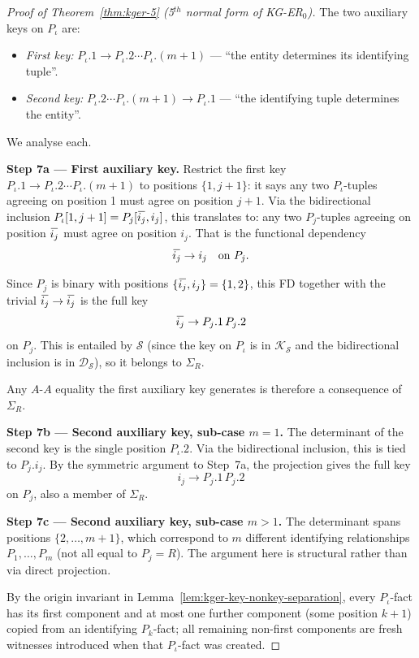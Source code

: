\documentclass[10pt]{article}
\newcommand{\ols}[1]{\mskip.5\thinmuskip\overline{\mskip-.5\thinmuskip {#1} \mskip-.5\thinmuskip}\mskip.5\thinmuskip} %
\begin{document}
\begin{proof}[Proof of Theorem~\ref{thm:kger-5} (5$^{th}$ normal form of KG-ER$_0$)]
The two auxiliary keys on \(P_\iota\) are:
\begin{itemize}
\item \emph{First key:} \(P_\iota.1\to P_\iota.2\cdots P_\iota.(m+1)\)
--- ``the entity determines its identifying tuple''.
\item \emph{Second key:}
\(P_\iota.2\cdots P_\iota.(m+1)\to P_\iota.1\) --- ``the identifying
tuple determines the entity''.
\end{itemize}
We analyse each.

\smallskip\noindent\textbf{Step 7a --- First auxiliary key.}
Restrict the first key \(P_\iota.1\to P_\iota.2\cdots P_\iota.(m+1)\)
to positions \(\{1,j+1\}\): it says any two \(P_\iota\)-tuples
agreeing on position 1 must agree on position \(j+1\).  Via the
bidirectional inclusion \(P_\iota[1,j+1]=P_j[\ols{i_j},i_j]\), this
translates to: any two \(P_j\)-tuples agreeing on position
\(\ols{i_j}\) must agree on position \(i_j\).  That is the functional
dependency
\[
\ols{i_j}\to i_j \quad\text{on } P_j.
\]

Since \(P_j\) is binary with positions
\(\{\ols{i_j},i_j\}=\{1,2\}\), this FD together with the trivial
\(\ols{i_j}\to\ols{i_j}\) is the full key
\[
\ols{i_j}\to P_j.1\,P_j.2
\]
on \(P_j\).  This is entailed by \(\mathcal S\) (since the key on
\(P_\iota\) is in \(\mathcal K_{\mathcal S}\) and the bidirectional
inclusion is in \(\mathcal D_{\mathcal S}\)), so it belongs to
\(\Sigma_R\).

Any \(A\)-\(A\) equality the first auxiliary key generates is
therefore a consequence of \(\Sigma_R\).

\smallskip\noindent\textbf{Step 7b --- Second auxiliary key, sub-case
\(m=1\).}
The determinant of the second key is the single position
\(P_\iota.2\).  Via the bidirectional inclusion, this is tied to
\(P_j.i_j\).  By the symmetric argument to Step~7a, the projection
gives the full key
\[
i_j\to P_j.1\,P_j.2
\]
on \(P_j\), also a member of \(\Sigma_R\).

\smallskip\noindent\textbf{Step 7c --- Second auxiliary key, sub-case
\(m>1\).}
The determinant spans positions \(\{2,\ldots,m+1\}\), which correspond
to \(m\) different identifying relationships \(P_1,\ldots,P_m\) (not
all equal to \(P_j=R\)).  The argument here is structural rather than
via direct projection.

By the origin invariant in
Lemma~\ref{lem:kger-key-nonkey-separation}, every \(P_\iota\)-fact has
its first component and at most one further component (some position
\(k+1\)) copied from an identifying \(P_k\)-fact; all remaining
non-first components are fresh witnesses introduced when that
\(P_\iota\)-fact was created.


\end{proof}
\end{document}
